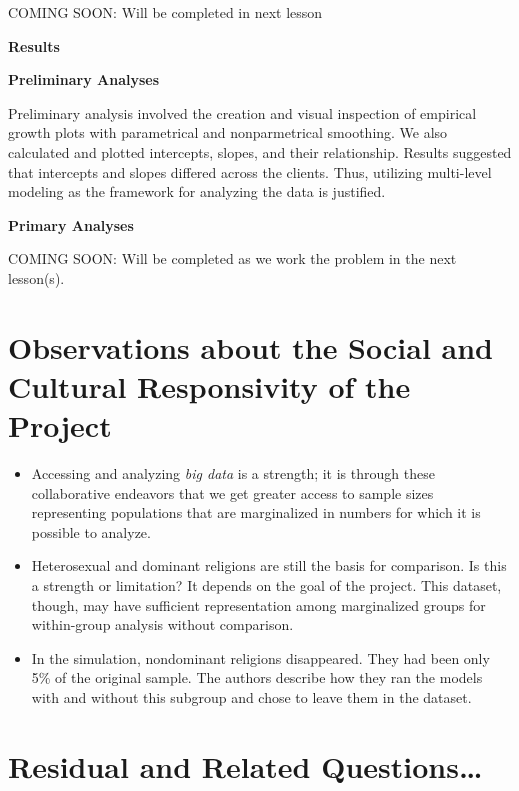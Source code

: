 \documentclass[
  english,
]{book}
\providecommand{\tightlist}{%
  \setlength{\itemsep}{0pt}\setlength{\parskip}{0pt}}
\begin{document}
COMING SOON: Will be completed in next lesson

\textbf{Results}

\textbf{Preliminary Analyses}

Preliminary analysis involved the creation and visual inspection of empirical growth plots with parametrical and nonparmetrical smoothing. We also calculated and plotted intercepts, slopes, and their relationship. Results suggested that intercepts and slopes differed across the clients. Thus, utilizing multi-level modeling as the framework for analyzing the data is justified.

\textbf{Primary Analyses}

COMING SOON: Will be completed as we work the problem in the next lesson(s).

\hypertarget{observations-about-the-social-and-cultural-responsivity-of-the-project}{%
\section{Observations about the Social and Cultural Responsivity of the Project}\label{observations-about-the-social-and-cultural-responsivity-of-the-project}}

\begin{itemize}
\tightlist
\item
  Accessing and analyzing \emph{big data} is a strength; it is through these collaborative endeavors that we get greater access to sample sizes representing populations that are marginalized in numbers for which it is possible to analyze.
\item
  Heterosexual and dominant religions are still the basis for comparison. Is this a strength or limitation? It depends on the goal of the project. This dataset, though, may have sufficient representation among marginalized groups for within-group analysis without comparison.
\item
  In the simulation, nondominant religions disappeared. They had been only 5\% of the original sample. The authors describe how they ran the models with and without this subgroup and chose to leave them in the dataset.
\end{itemize}

\hypertarget{residual-and-related-questions-1}{%
\section{Residual and Related Questions\ldots{}}\label{residual-and-related-questions-1}}
\end{document}
